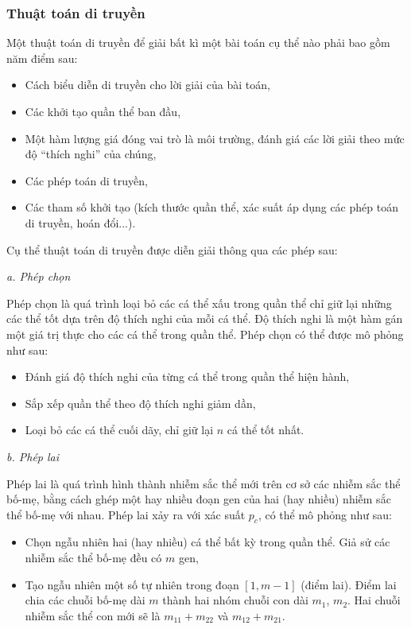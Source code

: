 \documentclass[12pt,a4paper]{report}
\begin{document}
\subsubsection{Thuật toán di truyền}
Một thuật toán di truyền để giải bất kì một bài toán cụ thể nào phải bao gồm năm điểm sau:
	\begin{itemize}
		\item Cách biểu diễn di truyền cho lời giải của bài toán,
		\item Các khởi tạo quần thể ban đầu,
		\item Một hàm lượng giá đóng vai trò là môi trường, đánh giá các lời giải theo mức độ ``thích nghi'' của chúng,
		\item Các phép toán di truyền,
		\item Các tham số khởi tạo (kích thước quần thể, xác suất áp dụng các phép toán di truyền, hoán đổi...).
	\end{itemize}
Cụ thể thuật toán di truyền được diễn giải thông qua các phép sau:

\textit{a. Phép chọn}

Phép chọn là quá trình loại bỏ các cá thể xấu trong quần thể chỉ giữ lại những các thể tốt dựa trên độ thích nghi của mỗi cá thể. Độ thích nghi là một hàm gán một giá trị thực cho các cá thể trong quần thể. Phép chọn có thể được mô phỏng như sau:
	\begin{itemize}
		\item Đánh giá độ thích nghi của từng cá thể trong quần thể hiện hành,
		\item Sắp xếp quần thể theo độ thích nghi giảm dần,
		\item Loại bỏ các cá thể cuối dãy, chỉ giữ lại $n$ cá thể tốt nhất.
	\end{itemize}

\textit{b. Phép lai}

Phép lai là quá trình hình thành nhiễm sắc thể mới trên cơ sở các nhiễm sắc thể bố-mẹ, bằng cách ghép một hay nhiều đoạn gen của hai (hay nhiều) nhiễm sắc thể bố-mẹ với nhau. Phép lai xảy ra với xác suất $p_c$, có thể mô phỏng như sau:
	\begin{itemize}
		\item Chọn ngẫu nhiên hai (hay nhiều) cá thể bất kỳ trong quần thể. Giả sử các nhiễm sắc thể bố-mẹ đều có $m$ gen,
		\item Tạo ngẫu nhiên một số tự nhiên trong đoạn $[1, m-1]$ (điểm lai). Điểm lai chia các chuỗi bố-mẹ dài $m$ thành hai nhóm chuỗi con dài $m_1$, $m_2$. Hai chuỗi nhiễm sắc thể con mới sẽ là $m_{11} + m_{22}$ và $m_{12} + m_{21}$.
	\end{itemize}
\end{document}
